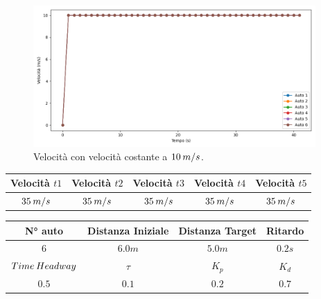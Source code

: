 \begin{figure}[H]
    \includegraphics[width=0.96\textwidth]{images/5-experiment/velocity/velocity_10-10-10-10-10.png}
    \caption{Velocità con velocità costante a $10\hspace{0.2em}m/s$.}
    \label{fig:10-constvelocity-velocity}
\end{figure}

\newpage

\begin{table}[h]
    \centering
    \begin{tabular}{|c|c|c|c|c|}
        \hline
        Velocità $t1$ & Velocità $t2$ & Velocità $t3$ &Velocità $t4$ &Velocità $t5$\\
        \hline
            $35\hspace{0.2em}m/s$ & $35\hspace{0.2em}m/s$ & $35\hspace{0.2em}m/s$ & $35\hspace{0.2em}m/s$ & $35\hspace{0.2em}m/s$ \\
        \hline
    \end{tabular}
\end{table}
\begin{table}[h]
    \centering
    \begin{tabular}{|c|c|c|c|}
        \hline
        N° auto & Distanza Iniziale & Distanza Target & Ritardo \\
        \hline
        $6$ & $6.0 m$ & $5.0 m$ & $0.2 s$ \\
        \hline
        $Time\hspace{0.2em}Headway$ & $\tau$ & $K_p$ & $K_d$  \\
        \hline
        $0.5$ & $0.1$ & $0.2$ & $0.7$ \\
        \hline
    \end{tabular}
\end{table}

